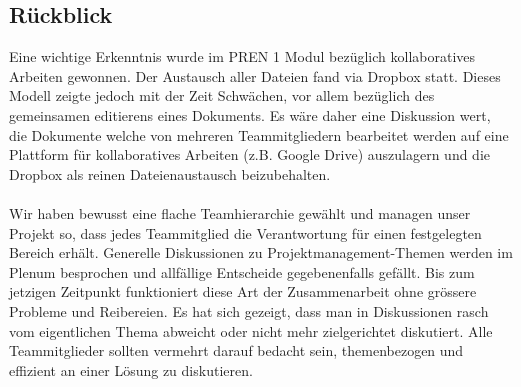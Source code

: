 \subsection{Rückblick}
Eine wichtige Erkenntnis wurde im PREN 1 Modul bezüglich kollaboratives Arbeiten 
gewonnen. Der Austausch aller Dateien fand via Dropbox statt. Dieses Modell zeigte 
jedoch mit der Zeit Schwächen, vor allem bezüglich des gemeinsamen editierens eines 
Dokuments. Es wäre daher eine Diskussion wert, die Dokumente welche von mehreren 
Teammitgliedern bearbeitet werden auf eine Plattform für kollaboratives Arbeiten 
(z.B. Google Drive) auszulagern und die Dropbox als reinen Dateienaustausch 
beizubehalten.\\
\\
Wir haben bewusst eine flache Teamhierarchie gewählt und managen unser Projekt 
so, dass jedes Teammitglied die Verantwortung für einen festgelegten Bereich 
erhält. Generelle Diskussionen zu Projektmanagement-Themen werden im Plenum 
besprochen und allfällige Entscheide gegebenenfalls gefällt. Bis zum jetzigen 
Zeitpunkt funktioniert diese Art der Zusammenarbeit ohne grössere Probleme und 
Reibereien. Es hat sich gezeigt, dass man in Diskussionen rasch vom eigentlichen 
Thema abweicht oder nicht mehr zielgerichtet diskutiert. Alle Teammitglieder 
sollten vermehrt darauf bedacht sein, themenbezogen und effizient an einer Lösung 
zu diskutieren.
